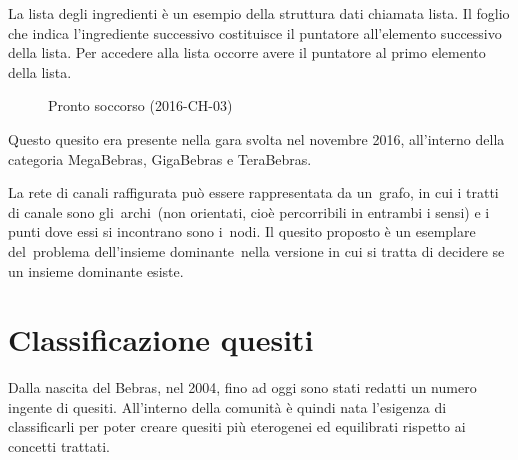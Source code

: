 \documentclass[12pt]{report}
\begin{document}
La lista degli ingredienti è un esempio della struttura dati chiamata lista. Il foglio che indica l'ingrediente successivo costituisce il puntatore all'elemento successivo della lista. Per accedere alla lista occorre avere il puntatore al primo elemento della lista.
%
%
%
\\
\begin{figure}[H]
	\centering
	\caption{Pronto soccorso (2016-CH-03)}\label{fig:2}
\end{figure}
Questo quesito era presente nella gara svolta nel novembre 2016, all'interno della categoria MegaBebras, GigaBebras e TeraBebras.

La rete di canali raffigurata può essere rappresentata da un grafo, in cui i tratti di canale sono gli archi (non orientati, cioè percorribili in entrambi i sensi) e i punti dove essi si incontrano sono i nodi. Il quesito proposto è un esemplare del problema dell’insieme dominante nella versione in cui si tratta di decidere se un insieme dominante esiste. 

\section{Classificazione quesiti}
Dalla nascita del Bebras, nel 2004, fino ad oggi sono stati redatti un numero ingente di quesiti. All'interno della comunità è quindi nata l'esigenza di classificarli per poter creare quesiti più eterogenei ed equilibrati rispetto ai concetti trattati.
\end{document}
